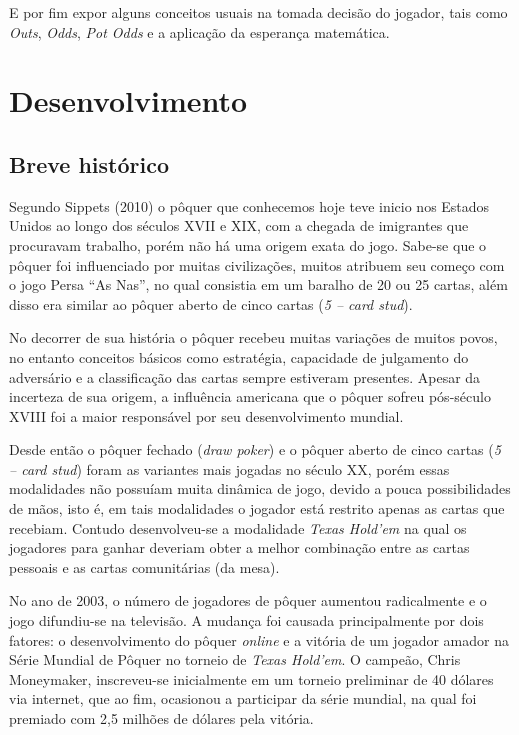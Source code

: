 \documentclass[
	12pt,				%
	oneside,			%
	a4paper,			%
	chapter=TITLE,		%
	section=TITLE,		%
	subsection=Title,	%
	subsubsection=Title,%
	brazil,				%
	]{abntex2}
\begin{document}
E por fim expor alguns conceitos usuais na tomada decisão do jogador, tais como \textit{Outs}, \textit{Odds}, \textit{Pot Odds} e a aplicação da esperança matemática. 


\chapter{Desenvolvimento}

\section{Breve histórico}
Segundo Sippets (2010) o pôquer que conhecemos hoje teve inicio nos Estados Unidos ao longo dos séculos XVII e XIX, com a chegada de imigrantes que procuravam trabalho, porém não há uma origem exata do jogo. Sabe-se que o pôquer foi influenciado por muitas civilizações, muitos atribuem seu começo com o jogo Persa ``As Nas'', no qual consistia em um baralho de 20 ou 25 cartas, além disso era similar ao pôquer aberto de cinco cartas (\textit{5 -- card stud}). 

No decorrer de sua história o pôquer recebeu muitas variações de muitos povos, no entanto conceitos básicos como estratégia, capacidade de julgamento do adversário e a classificação das cartas sempre estiveram presentes. Apesar da incerteza de sua origem, a influência americana que o pôquer sofreu pós-século XVIII foi a maior responsável por seu desenvolvimento mundial. 

Desde então o pôquer fechado (\textit{draw poker}) e o pôquer aberto de cinco cartas (\textit{5 -- card stud}) foram as variantes mais jogadas no século XX, porém essas modalidades não possuíam muita dinâmica de jogo, devido a pouca possibilidades de mãos, isto é, em tais modalidades o jogador está restrito apenas as cartas que recebiam. Contudo desenvolveu-se a modalidade \textit{Texas Hold'em} na qual os jogadores para ganhar deveriam obter a melhor combinação entre as cartas pessoais e as cartas comunitárias (da mesa). 

No ano de 2003, o número de jogadores de pôquer aumentou radicalmente e o jogo difundiu-se na televisão. A mudança foi causada principalmente por dois fatores: o desenvolvimento do pôquer \textit{online} e a vitória de um jogador amador na Série Mundial de Pôquer no torneio de \textit{Texas Hold'em}. O campeão, Chris Moneymaker, inscreveu-se inicialmente em um torneio preliminar de 40 dólares via internet, que ao fim, ocasionou a participar da série mundial, na qual foi premiado com 2,5 milhões de dólares pela vitória.
\end{document}
